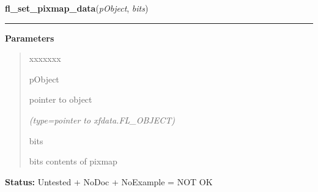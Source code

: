     \label{xformslib:library:fl_set_pixmap_data}

    \vspace{0.5ex}

\hspace{.8\funcindent}\begin{boxedminipage}{\funcwidth}

    \raggedright \textbf{fl\_set\_pixmap\_data}(\textit{pObject}, \textit{bits})

    \vspace{-1.5ex}

    \rule{\textwidth}{0.5\fboxrule}
\setlength{\parskip}{2ex}
\setlength{\parskip}{1ex}
      \textbf{Parameters}
      \vspace{-1ex}

      \begin{quote}
        \begin{Ventry}{xxxxxxx}

          \item[pObject]

          pointer to object

            {\it (type=pointer to xfdata.FL\_OBJECT)}

          \item[bits]

          bits contents of pixmap

        \end{Ventry}

      \end{quote}

\textbf{Status:} Untested + NoDoc + NoExample = NOT OK



    \end{boxedminipage}

    \label{xformslib:library:fl_set_pixmap_file}

    \vspace{0.5ex}

